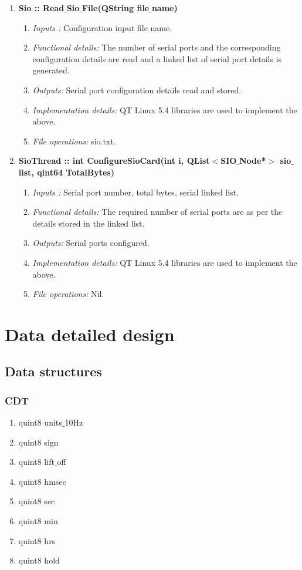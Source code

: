 \begin{enumerate}
\begin{enumerate}
	\item  \textbf{Sio :: Read$\_$Sio$\_$File(QString file$\_$name)}
	\begin{enumerate}
		\item \textit{Inputs :} Configuration input file name.
		\item \textit{Functional details:} The number of serial ports and the corresponding configuration details are read and a linked list of serial port details is generated. 
		\item \textit{Outputs:} Serial port configuration details read and stored.
		\item \textit{Implementation details:} QT Linux 5.4 libraries are used to implement the above.
		\item \textit{File operations:} sio.txt.
	\end{enumerate}
	
	\item  \textbf{SioThread :: int ConfigureSioCard(int i, QList$<$SIO$\_$Node*$>$ sio$\_$list, qint64 TotalBytes)}
	\begin{enumerate}
		\item \textit{Inputs :} Serial port number, total bytes, serial linked list.
		\item \textit{Functional details:} The required number of serial ports are as per the details stored in the linked list. 
		\item \textit{Outputs:} Serial ports configured. 
		\item \textit{Implementation details:} QT Linux 5.4 libraries are used to implement the above.
		\item \textit{File operations:} Nil.
	\end{enumerate}

\end{enumerate}

\section{Data detailed design}

\subsection{Data structures}
\subsubsection{CDT}
\begin{enumerate}
	\item quint8 units$\_$10Hz 
	\item quint8 sign       
	\item quint8 lift$\_$off  
	\item quint8 hmsec    
	\item quint8 sec       
	\item quint8 min        
	\item quint8 hrs        
	\item quint8 hold
\end{enumerate}

\end{enumerate}
